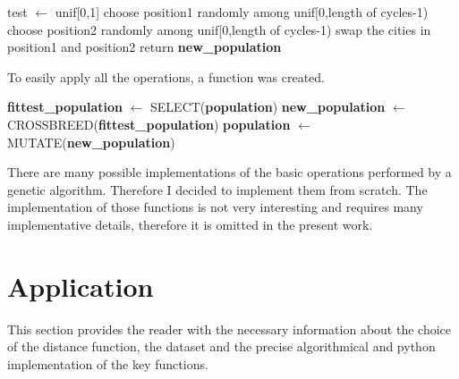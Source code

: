 \documentclass{article}
\begin{document}
\begin{algorithm}[H]
    \begin{algorithmic}[1]
        \State test $\leftarrow$ unif[0,1]
        	\State choose position1 randomly among unif[0,length of cycles-1)
  			\State choose position2 randomly among unif[0,length of cycles-1)
  			\State swap the cities in position1 and position2
        \EndIf
       \EndFor
        \State return \textbf{new\_population}
       \EndFunction
\end{algorithmic}
\end{algorithm}
\noindent To easily apply all the operations, a function was created.

\begin{algorithm}[H]
    \begin{algorithmic}[1]
        \State \textbf{fittest\_population} $\leftarrow$ SELECT(\textbf{population})
        \State \textbf{new\_population} $\leftarrow$ CROSSBREED(\textbf{fittest\_population})
       \State \textbf{population} $\leftarrow$ MUTATE(\textbf{new\_population})
       \EndFunction
\end{algorithmic}
\end{algorithm}

\noindent There are many possible implementations of the basic operations performed by a genetic algorithm. Therefore I decided to implement them from scratch. The implementation of those functions is not very interesting and requires many implementative details, therefore it is omitted in the present work.

\section{Application} 
This section provides the reader with the necessary information about the choice of the distance function, the dataset and the precise algorithmical and python implementation of the key functions.
\end{document}
